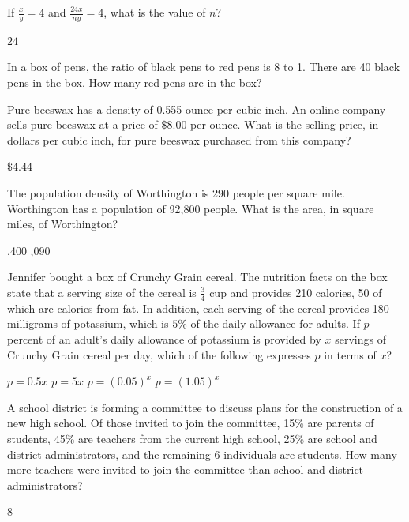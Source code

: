 \question[1]
If $\frac{x}{y}=4$ and $\frac{24 x}{n y}=4$, what is the value of $n$?
\begin{solutionorbox}[1.25in]
  $24$
\end{solutionorbox}

\question[1]
In a box of pens, the ratio of black pens to red pens is 8 to 1. There are 40 black pens in the box. How many red pens are in the box?
\begin{choices}
\end{choices}

\question[1]
Pure beeswax has a density of 0.555 ounce per cubic inch. An online company sells pure beeswax at a price of $\$ 8.00$ per ounce. What is the selling price, in dollars per cubic inch, for pure beeswax purchased from this company?
\begin{solutionorbox}[1.25in]
  $\$ 4.44$
\end{solutionorbox}




\question[1]
The population density of Worthington is 290 people per square mile. Worthington has a population of 92,800 people. What is the area, in square miles, of Worthington?
\begin{choices}
  ,400
  ,090
\end{choices}

\question[1]
Jennifer bought a box of Crunchy Grain cereal. The nutrition facts on the box state that a serving size of the cereal is $\frac{3}{4}$ cup and provides 210 calories, 50 of which are calories from fat. In addition, each serving of the cereal provides 180 milligrams of potassium, which is $5\%$ of the daily allowance for adults. If $p$ percent of an adult's daily allowance of potassium is provided by $x$ servings of Crunchy Grain cereal per day, which of the following expresses $p$ in terms of $x$?
\begin{choices}
  \choice $p=0.5 x$
  \CorrectChoice $p=5 x$
  \choice $p=(0.05)^{x}$
  \choice $p=(1.05)^{x}$
\end{choices}



\newpage


\question[1]
A school district is forming a committee to discuss plans for the construction of a new high school. Of those invited to join the committee, 15\% are parents of students, 45\% are teachers from the current high school, 25\% are school and district administrators, and the remaining 6 individuals are students. How many more teachers were invited to join the committee than school and district administrators?
\begin{solutionorbox}[1.25in]
  $8$
\end{solutionorbox}





